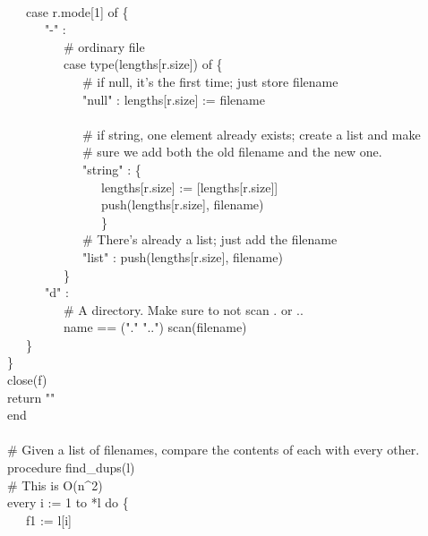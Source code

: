 {\ \\
\>   \ \ \ case r.mode[1] of \{ \\
\>   \ \ \ \ \ \ "-" : \\
\>   \ \ \ \ \ \ \ \ \ \# ordinary file \\
\>   \ \ \ \ \ \ \ \ \ case type(lengths[r.size]) of \{ \\
\>   \ \ \ \ \ \ \ \ \ \ \ \ \# if null, it's the
first time; just store filename \\
\>   \ \ \ \ \ \ \ \ \ \ \ \ "null" :
lengths[r.size] := filename \\
\ \\
\>   \ \ \ \ \ \ \ \ \ \ \ \ \# if string, one element already exists;
create a list and make\\
\>   \ \ \ \ \ \ \ \ \ \ \ \ \# sure we add both the old
filename and the new one. \\
\>   \ \ \ \ \ \ \ \ \ \ \ \ "string" : \{ \\
\>   \ \ \ \ \ \ \ \ \ \ \ \ \ \ \ lengths[r.size] :=
[lengths[r.size]] \\
\>   \ \ \ \ \ \ \ \ \ \ \ \ \ \ \ push(lengths[r.size], filename) \\
\>   \ \ \ \ \ \ \ \ \ \ \ \ \ \ \ \} \\
\>   \ \ \ \ \ \ \ \ \ \ \ \ \# There's already a
list; just add the filename \\
\>   \ \ \ \ \ \ \ \ \ \ \ \ "list" :
push(lengths[r.size], filename) \\
\>   \ \ \ \ \ \ \ \ \ \} \\
\>   \ \ \ \ \ \ "d" : \\
\>   \ \ \ \ \ \ \ \ \ \# A directory. Make sure to not scan . or .. \\
\>   \ \ \ \ \ \ \ \ \ name == ("."
{\textbar} "..") {\textbar} scan(filename) \\
\>   \ \ \ \} \\
\>   \} \\
\>   close(f) \\
\>   return "" \\
end \\
\ \\
\# Given a list of filenames, compare the contents of each with every other.\\
procedure find\_dups(l) \\
\>   \# This is O(n\^{}2) \\
\>   every i := 1 to *l do \{ \\
\>   \ \ \ f1 := l[i] \\
}
